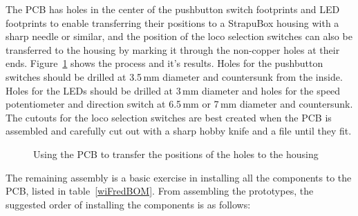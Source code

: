 \documentclass[11pt,a4paper]{scrartcl}
\begin{document}
The PCB has holes in the center of the pushbutton switch footprints and LED footprints to enable transferring their positions to a StrapuBox housing with a sharp needle or similar, and the position of the loco selection switches can also be transferred to the housing by marking it through the non-copper holes at their ends. Figure~\ref{transferHoles} shows the process and it's results. Holes for the pushbutton switches should be drilled at 3.5\,mm diameter and countersunk from the inside. Holes for the LEDs should be drilled at 3\,mm diameter and holes for the speed potentiometer and direction switch at 6.5\,mm or 7\,mm diameter and countersunk. The cutouts for the loco selection switches are best created when the PCB is assembled and carefully cut out with a sharp hobby knife and a file until they fit.

\begin{figure}[tbh]
  \centering
  \caption{Using the PCB to transfer the positions of the holes to the housing}
  \label{transferHoles}
\end{figure}

The remaining assembly is a basic exercise in installing all the components to the PCB, listed in table~\ref{wiFredBOM}. From assembling the prototypes, the suggested order of installing the components is as follows:
\end{document}
